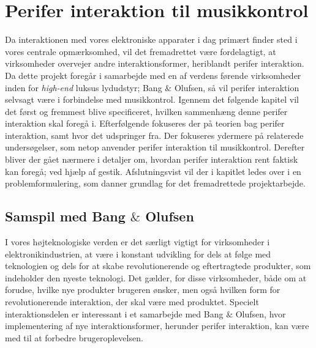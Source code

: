 \chapter{Perifer interaktion til musikkontrol}
\label{PeriferInteraktionTilMusikKontrol}
%
Da interaktionen med vores elektroniske apparater i dag primært finder sted i vores centrale opmærksomhed, vil det fremadrettet være fordelagtigt, at virksomheder overvejer andre interaktionsformer, heriblandt perifer interaktion. Da dette projekt foregår i samarbejde med en af verdens førende virksomheder inden for \textit{high-end} luksus lydudstyr; Bang $\&$ Olufsen, så vil perifer interaktion selvsagt være i forbindelse med musikkontrol. Igennem det følgende kapitel vil det først og fremmest blive specificeret, hvilken sammenhæng denne perifer interaktion skal foregå i. Efterfølgende fokuseres der på teorien bag perifer interaktion, samt hvor det udspringer fra. Der fokuseres ydermere på relaterede undersøgelser, som netop anvender perifer interaktion til musikkontrol. Derefter bliver der gået nærmere i detaljer om, hvordan perifer interaktion rent faktisk kan foregå; ved hjælp af gestik. Afslutningsvist vil der i kapitlet ledes over i en problemformulering, som danner grundlag for det fremadrettede projektarbejde.    
%
\section{Samspil med Bang $\&$ Olufsen}
\label{SamspilMedBO}
%
I vores højteknologiske verden er det særligt vigtigt for virksomheder i elektronikindustrien, at være i konstant udvikling for dels at følge med teknologien og dels for at skabe revolutionerende og eftertragtede produkter, som indeholder den nyeste teknologi. Det gælder, for disse virksomheder, både om at forudse, hvilke nye produkter brugeren ønsker, men også hvilken form for revolutionerende interaktion, der skal være med produktet. Specielt interaktionsdelen er interessant i et samarbejde med Bang $\&$ Olufsen, hvor implementering af nye interaktionsformer, herunder perifer interaktion, kan være med til at forbedre brugeroplevelsen.

